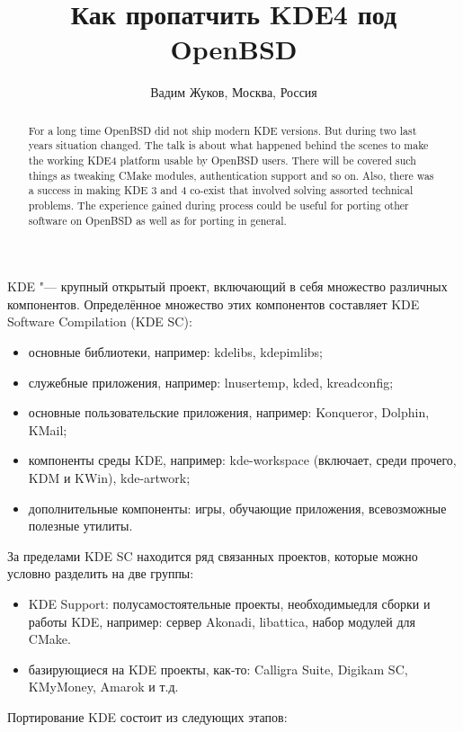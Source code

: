 \documentclass[10pt, a5paper]{article}
\begin{document}
\title{Как пропатчить KDE4 под OpenBSD}
\author{Вадим Жуков, Москва, Россия}
\maketitle
\begin{abstract}
For a long time OpenBSD did not ship modern KDE versions. But during two last years situation changed. The talk is about what happened behind the scenes to make the working KDE4 platform usable by OpenBSD users. There will be covered such things as tweaking CMake modules, authentication support and so on. Also, there was a success in making KDE 3 and 4 co-exist that involved solving assorted technical problems. The experience gained during process could be useful for porting other software on OpenBSD as well as for porting in general.
\end{abstract}
KDE "--- крупный открытый проект, включающий в себя множество различных компонентов. Определённое множество этих компонентов составляет KDE Software Compilation (KDE SC):
\begin{itemize}
 \item основные библиотеки, например: kdelibs, kdepimlibs;
 \item служебные приложения, например: lnusertemp, kded, kread\-con\-fig;
 \item основные пользовательские приложения, например: Kon\-quer\-or, Dolphin, KMail;
 \item компоненты среды KDE, например: kde-workspace (включает, среди прочего, KDM и KWin), kde-artwork;
 \item дополнительные компоненты: игры, обучающие приложения, всевозможные полезные утилиты.
\end{itemize}

За пределами KDE SC находится ряд связанных проектов, которые можно условно разделить на две группы:
\begin{itemize}
 \item KDE Support: полусамостоятельные проекты, необходимые\linebreak для сборки и работы KDE, например: сервер Akonadi, lib\-at\-ti\-ca, набор модулей для CMake.
 \item базирующиеся на KDE проекты, как-то: Calligra Suite, Digikam SC, KMyMoney, Amarok и т.д.
\end{itemize}

Портирование KDE состоит из следующих этапов:
\end{document}
